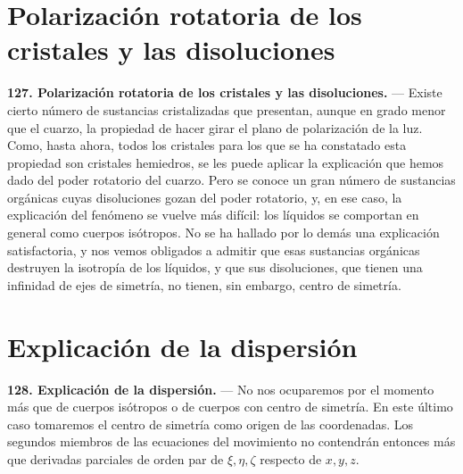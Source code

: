 \section{Polarización rotatoria de los cristales y las disoluciones}

\noindent\textbf{127. Polarización rotatoria de los cristales y las
disoluciones.} — Existe cierto número de sustancias cristalizadas
que presentan, aunque en grado menor que el cuarzo, la propiedad de hacer
girar el plano de polarización de la luz. Como, hasta ahora, todos los
cristales para los que se ha constatado esta propiedad son cristales
hemiedros, se les puede aplicar la explicación que hemos dado del poder
rotatorio del cuarzo. Pero se conoce un gran número de sustancias orgánicas
cuyas disoluciones gozan del poder rotatorio, y, en ese caso, la
explicación del fenómeno se vuelve más difícil: los líquidos se comportan
en general como cuerpos isótropos. No se ha hallado por lo demás una
explicación satisfactoria, y nos vemos obligados a admitir que esas
sustancias orgánicas destruyen la isotropía de los líquidos, y que sus
disoluciones, que tienen una infinidad de ejes de simetría, no tienen, sin
embargo, centro de simetría.

\section{Explicación de la dispersión}

\noindent\textbf{128. Explicación de la dispersión.} — No nos ocuparemos por el momento más que de cuerpos
isótropos o de cuerpos con centro de simetría. En este último caso tomaremos
el centro de simetría como origen de las coordenadas. Los segundos miembros
de las ecuaciones del movimiento no contendrán entonces más que derivadas
parciales de orden par de $\xi,\eta,\zeta$ respecto de $x,y,z$.

